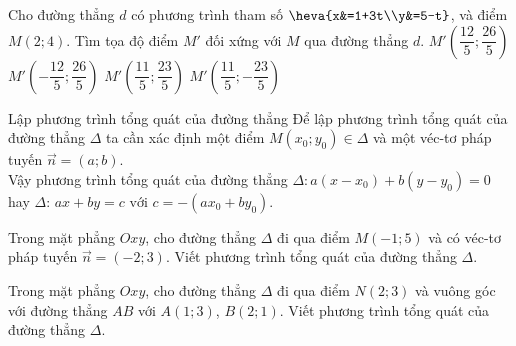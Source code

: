 \begin{ex}%
	Cho đường thẳng $d$ có phương trình tham số $\heva{x&=1+3t\\y&=5-t}$, và điểm $M(2;4)$. Tìm tọa độ điểm $M'$ đối xứng với $M$ qua đường thẳng $d$.
	\choice
	{\True $M'\left(\dfrac{12}{5};\dfrac{26}{5}\right)$}
	{$M'\left(-\dfrac{12}{5};\dfrac{26}{5}\right)$}
	{$M'\left(\dfrac{11}{5};\dfrac{23}{5}\right)$}
	{$M'\left(\dfrac{11}{5};-\dfrac{23}{5}\right)$}
\end{ex}
\begin{dang}{Lập phương trình tổng quát của đường thẳng}
	Để lập phương trình tổng quát của đường thẳng $\Delta$ ta cần xác định một điểm $M \left(x_0; y_0 \right) \in \Delta$ và một véc-tơ pháp tuyến $ \overrightarrow{n} = \left(a; b \right)$.\\
	Vậy phương trình tổng quát của đường thẳng $\Delta \colon a \left(x - x_0 \right) + b \left(y - y_0 \right) = 0$ hay $\Delta$: $ ax + by = c \text{ với } c = - \left(ax_0 + by_0 \right)$.
\end{dang}
\begin{vd}%
	Trong mặt phẳng $Oxy$, cho đường thẳng $\Delta$ đi qua điểm $M(-1;5)$ và có véc-tơ pháp tuyến $ \overrightarrow{n} = \left(-2;3 \right)$. Viết phương trình tổng quát của đường thẳng $\Delta$.
\end{vd}
\begin{vd}%
	Trong mặt phẳng $Oxy$, cho đường thẳng $\Delta$ đi qua điểm $N(2;3)$ và vuông góc với đường thẳng $AB$ với $A(1;3)$, $B(2;1)$. Viết phương trình tổng quát của đường thẳng $\Delta$.
\end{vd}
